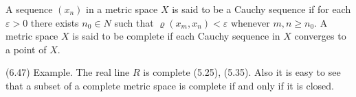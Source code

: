 A sequence $(x_n)$ in a metric space $X$ is said to be a Cauchy sequence if for each $\varepsilon > 0$ there exists $n_0 \in N$ such that $\varrho(x_m, x_n) < \varepsilon$ whenever $m, n \geq n_0$. A metric space $X$ is said to be complete if each Cauchy sequence in $X$ converges to a point of $X$.

(6.47) Example. The real line $R$ is complete (5.25), (5.35). Also it is easy to see that a subset of a complete metric space is complete if and only if it is closed.